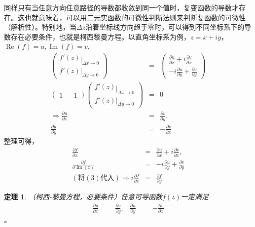 \documentclass[UTF8]{ctexart}
\newcommand{\barsuchthat}{|}
\newcommand{\divides}{\mathrel{|}}
\newcommand{\tmop}[1]{\ensuremath{\operatorname{#1}}}
\newtheorem{theorem}{定理}
\begin{document}
同样只有当任意方向任意路径的导数都收敛到同一个值时，复变函数的导数才存在。这也就意味着，可以用二元实函数的可微性判断法则来判断复函数的可微性（解析性）。特别地，当$\Delta
z$沿着坐标线方向趋于零时，可以得到不同坐标系下的导数存在必要条件，也就是柯西黎曼方程。以直角坐标系为例，$z
= x + i y$，$\tmop{Re} (f) = u, \tmop{Im} (f) = v$,
\begin{eqnarray}
  \left(\begin{array}{c}
    f' (z) \divides_{\Delta x \rightarrow 0}\\
    f' (z) \barsuchthat_{\Delta y \rightarrow 0}
  \end{array}\right) & = & \left(\begin{array}{c}
    \frac{\partial u}{\partial x} + i \frac{\partial v}{\partial x}\\
    - i \frac{\partial u}{\partial y} + \frac{\partial v}{\partial y}
  \end{array}\right) \nonumber\\
  \left(\begin{array}{cc}
    1 & - 1
  \end{array}\right) \left(\begin{array}{c}
    f' (z) \divides_{\Delta x \rightarrow 0}\\
    f' (z) \barsuchthat_{\Delta y \rightarrow 0}
  \end{array}\right) & = & 0 \nonumber\\
  \Rightarrow \frac{\partial u}{\partial x} & = & \frac{\partial v}{\partial
  y}, \nonumber\\
  \frac{\partial u}{\partial y} & = & - \frac{\partial v}{\partial x}
\end{eqnarray}
整理可得，
\begin{eqnarray}
  \frac{\partial f}{\partial x} & = & \frac{\partial u}{\partial x} + i
  \frac{\partial v}{\partial x}, \nonumber\\
  \frac{\partial f}{\partial \tmop{Im} (z)} & = & - i \frac{\partial
  u}{\partial y} + \frac{\partial v}{\partial y} \\
  (将 (3) 代入) \Rightarrow i \frac{\partial f}{\partial x} & = &
  \frac{\partial f}{\partial y}
\end{eqnarray}
\begin{theorem}
  （柯西-黎曼方程，必要条件）任意可导函数$f(z)$一定满足
  \begin{equation}
  \begin{array}{lll}
    \frac{\partial u}{\partial x} & = & \frac{\partial v}{\partial y},
  \end{array}
  \begin{array}{lll}
    \frac{\partial u}{\partial y} & = & - \frac{\partial v}{\partial x}
  \end{array}
  \end{equation}。
\end{theorem}
\end{document}
